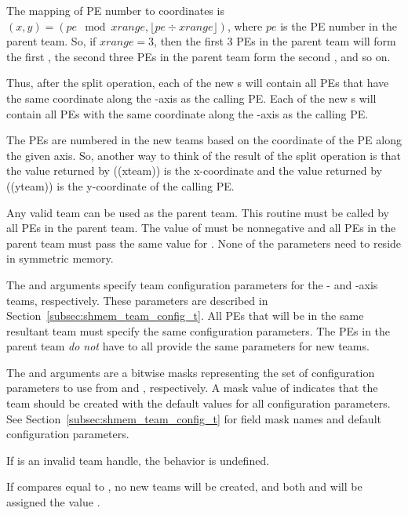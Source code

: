 \begin{apidefinition}
{The mapping of \ac{PE} number to coordinates is $(x, y) = ( pe \mod xrange, \lfloor pe \div xrange \rfloor )$,
where $pe$ is the \ac{PE} number in the parent team. So, if $xrange = 3$,
then the first 3 \acp{PE} in the parent team will form the first
, the second three \acp{PE} in the parent team form the second ,
and so on.

Thus, after the split operation, each of the new s will contain all \acp{PE} that
have the same coordinate along the -axis as the calling \ac{PE}. Each of the
new s will contain all \acp{PE} with the same coordinate along the
-axis as the calling \ac{PE}.

The \acp{PE} are numbered in the new teams based on the coordinate of the
\ac{PE} along the given axis. So, another way to think of the result of the split
operation is that the value returned by (\VAR(xteam)) is the
x-coordinate and the value returned by (\VAR(yteam))
is the y-coordinate of the calling \ac{PE}.

Any valid \openshmem team can be used as the parent team. This routine must be
called by all \acp{PE} in the parent team. The value of  must be
nonnegative and all \acp{PE} in the parent team must pass the same value for
. None of the parameters need to reside in symmetric memory.

The  and  arguments specify team
configuration parameters for the - and -axis teams, respectively.
These parameters are described in Section~\ref{subsec:shmem_team_config_t}.
All \acp{PE} that will be in the same resultant team must specify the same
configuration parameters.
The \acp{PE} in the parent team \emph{do not} have to all provide the same
parameters for new teams.

The  and arguments are a bitwise masks
representing the set of configuration parameters to use from
 and , respectively.
A mask value of  indicates that the team
should be created with the default values for all configuration parameters.
See Section~\ref{subsec:shmem_team_config_t} for field mask names and
default configuration parameters.

If  is an invalid team handle, the behavior is undefined.

If  compares equal to , no new
teams will be created, and both  and 
will be assigned the value .

}
\end{apidefinition}
